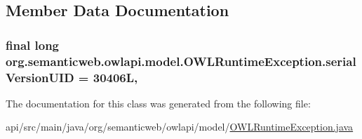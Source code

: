 \subsection{Member Data Documentation}
\hypertarget{classorg_1_1semanticweb_1_1owlapi_1_1model_1_1_o_w_l_runtime_exception_a9a76a5bfa1e106d0916884be678adf49}{
\subsubsection[{serial\-Version\-U\-I\-D}]{\setlength{\rightskip}{0pt plus 5cm}final long org.\-semanticweb.\-owlapi.\-model.\-O\-W\-L\-Runtime\-Exception.\-serial\-Version\-U\-I\-D = 30406\-L\hspace{0.3cm}{\ttfamily [static]}, {\ttfamily [private]}}}\label{classorg_1_1semanticweb_1_1owlapi_1_1model_1_1_o_w_l_runtime_exception_a9a76a5bfa1e106d0916884be678adf49}


The documentation for this class was generated from the following file\-:\begin{DoxyCompactItemize}
\item 
api/src/main/java/org/semanticweb/owlapi/model/\hyperlink{_o_w_l_runtime_exception_8java}{O\-W\-L\-Runtime\-Exception.\-java}\end{DoxyCompactItemize}
